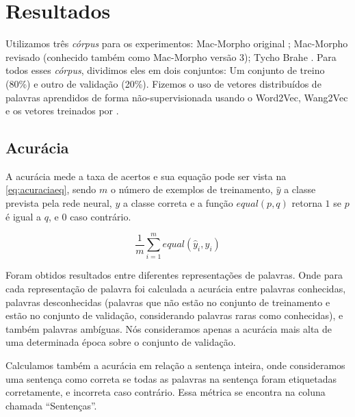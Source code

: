 \section{Resultados}

Utilizamos três \textit{córpus} para os experimentos: Mac-Morpho original \cite{aluisio2003account}; Mac-Morpho revisado \cite{fonseca2015evaluating} (conhecido também como Mac-Morpho versão 3); Tycho Brahe \cite{tychobrahe2010corpus}. Para todos esses \textit{córpus}, dividimos eles em dois conjuntos: Um conjunto de treino (80\%) e outro de validação (20\%). Fizemos o uso de vetores distribuídos de palavras aprendidos de forma não-supervisionada usando o Word2Vec, Wang2Vec e os vetores treinados por . 

\subsection{Acurácia}

A acurácia mede a taxa de acertos e sua equação pode ser vista na \autoref{eq:acuraciaeq}, sendo $m$ o número de exemplos de treinamento, $\hat{y}$ a classe prevista pela rede neural, $y$ a classe correta e a função $equal(p, q)$ retorna $1$ se $p$ é igual a $q$, e $0$ caso contrário.

\begin{equation}\label{eq:acuraciaeq}
\frac{1}{m} \sum\limits_{i=1}^{m} equal(\hat{y}_i, y_i) 
\end{equation}

Foram obtidos resultados entre diferentes representações de palavras. Onde para cada representação de palavra foi calculada a acurácia entre palavras conhecidas, palavras desconhecidas (palavras que não estão no conjunto de treinamento e estão no conjunto de validação, considerando palavras raras como conhecidas), e também palavras ambíguas. Nós consideramos apenas a acurácia mais alta de uma determinada época sobre o conjunto de validação.

Calculamos também a acurácia em relação a sentença inteira, onde consideramos uma sentença como correta se todas as palavras na sentença foram etiquetadas corretamente, e incorreta caso contrário. Essa métrica se encontra na coluna chamada ``Sentenças''.


